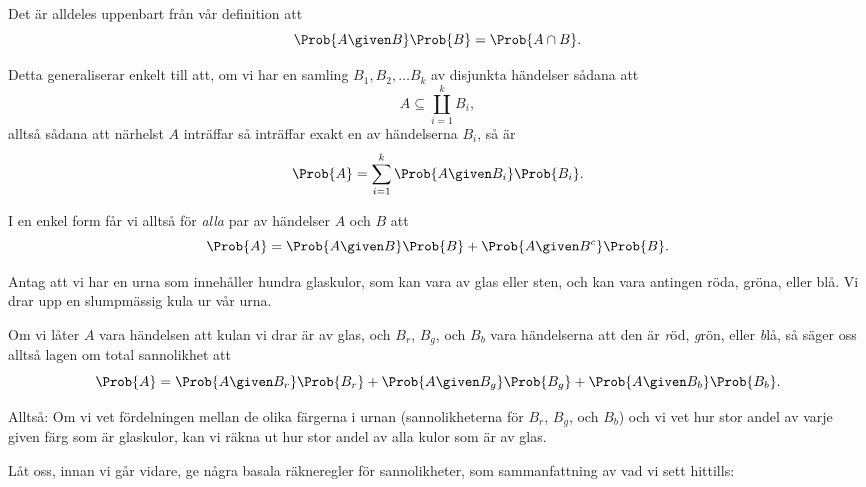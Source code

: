 \documentclass[nobib]{tufte-handout}
\begin{document}
\begin{lemma}\label{law_of_total_probability}
    Det är alldeles uppenbart från vår definition att
    $$\Prob{A \given B}\Prob{B} = \Prob{A \cap B}.$$

    Detta generaliserar enkelt till att, om vi har en samling $B_1, B_2, \ldots B_k$ av disjunkta händelser sådana att
    $$A \subseteq \coprod_{i=1}^k B_i,$$
    alltså sådana att närhelst $A$ inträffar så inträffar exakt en av händelserna $B_i$, så är
    $$\Prob{A} = \sum_{i=1}^{k} \Prob{A \given B_i}\Prob{B_i}.$$

    I en enkel form får vi alltså för \emph{alla} par av händelser $A$ och $B$ att
    $$\Prob{A} = \Prob{A \given B}\Prob{B} + \Prob{A \given B^c}\Prob{B}.$$
\end{lemma}

\begin{example}
    Antag att vi har en urna som innehåller hundra glaskulor, som kan vara av glas eller sten, och kan vara antingen röda, gröna, eller blå. Vi drar upp en slumpmässig kula ur vår urna.

    Om vi låter $A$ vara händelsen att kulan vi drar är av glas, och $B_r$, $B_g$, och $B_b$ vara händelserna att den är \emph{r}öd, \emph{g}rön, eller \emph{b}lå, så säger oss alltså lagen om total sannolikhet att
    $$\Prob{A} = \Prob{A \given B_r}\Prob{B_r} + \Prob{A \given B_g}\Prob{B_g} + \Prob{A \given B_b}\Prob{B_b}.$$

    Alltså: Om vi vet fördelningen mellan de olika färgerna i urnan (sannolikheterna för $B_r$, $B_g$, och $B_b$) och vi vet hur stor andel av varje given färg som är glaskulor, kan vi räkna ut hur stor andel av alla kulor som är av glas.
\end{example}

Låt oss, innan vi går vidare, ge några basala räkneregler för sannolikheter, som sammanfattning av vad vi sett hittills:
\end{document}
